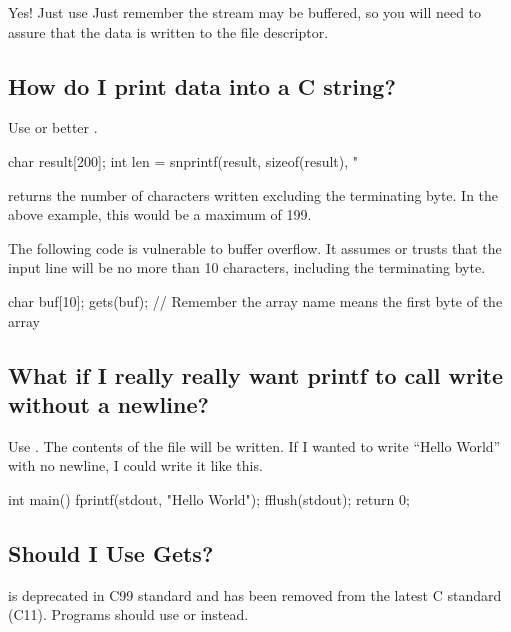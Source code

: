 Yes! Just use  Just remember the stream may be buffered, so you will need to assure that the data is written to the file descriptor.

\subsection{How do I print data into a C string?}

Use  or better .

\begin{code}[language=C]
char result[200];
int len = snprintf(result, sizeof(result), "%
\end{code}

 returns the number of characters written excluding the terminating byte. In the above example, this would be a maximum of 199.

The following code is vulnerable to buffer overflow. It assumes or trusts that the input line will be no more than 10 characters, including the terminating byte.

\begin{code}[language=C]
char buf[10];
gets(buf); // Remember the array name means the first byte of the array
\end{code}

\subsection{What if I really really want printf to call write without a newline?}

Use . The contents of the file will be written. If I wanted to write ``Hello World'' with no newline, I could write it like this.

\begin{code}[language=C]
int main(){
    fprintf(stdout, "Hello World");
    fflush(stdout);
    return 0;
}
\end{code}

\subsection{Should I Use Gets?}

 is deprecated in C99 standard and has been removed from the latest C standard (C11). Programs should use  or  instead.

